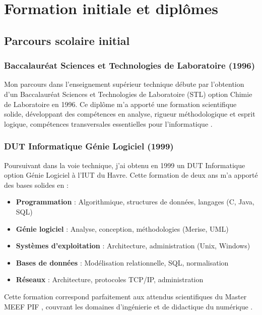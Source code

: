 \chapter{Formation initiale et diplômes}

\section{Parcours scolaire initial}

\subsection{Baccalauréat Sciences et Technologies de Laboratoire (1996)}

Mon parcours dans l'enseignement supérieur technique débute par l'obtention d'un Baccalauréat Sciences et Technologies de Laboratoire (STL) option Chimie de Laboratoire en 1996. Ce diplôme m'a apporté une formation scientifique solide, développant des compétences en analyse, rigueur méthodologique et esprit logique, compétences transversales essentielles pour l'informatique \parencite{competences_21_siecle}.

\subsection{DUT Informatique Génie Logiciel (1999)}

Poursuivant dans la voie technique, j'ai obtenu en 1999 un DUT Informatique option Génie Logiciel à l'IUT du Havre. Cette formation de deux ans m'a apporté des bases solides en :

\begin{itemize}[leftmargin=*]
    \item \textbf{Programmation} : Algorithmique, structures de données, langages (C, Java, SQL)
    \item \textbf{Génie logiciel} : Analyse, conception, méthodologies (Merise, UML)
    \item \textbf{Systèmes d'exploitation} : Architecture, administration (Unix, Windows)
    \item \textbf{Bases de données} : Modélisation relationnelle, SQL, normalisation
    \item \textbf{Réseaux} : Architecture, protocoles TCP/IP, administration
\end{itemize}

Cette formation correspond parfaitement aux attendus scientifiques du Master MEEF PIF \parencite{rncp38152}, couvrant les domaines d'ingénierie et de didactique du numérique \parencite{eduscol_nsi}.

